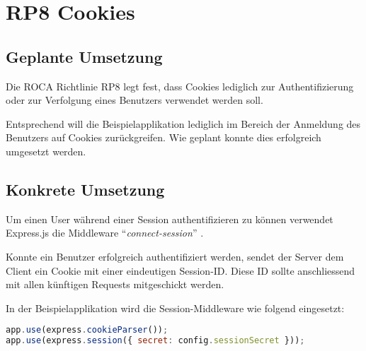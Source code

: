 \section{RP8 Cookies}
\label{sec:principle-rp8-cookies}

\subsection*{Geplante Umsetzung}
Die ROCA Richtlinie RP8 legt fest, dass Cookies lediglich zur Authentifizierung oder zur Verfolgung eines Benutzers verwendet werden soll.

Entsprechend will die Beispielapplikation lediglich im Bereich der Anmeldung des Benutzers auf Cookies zurückgreifen. Wie geplant konnte dies erfolgreich umgesetzt werden.

\subsection*{Konkrete Umsetzung}
Um einen User während einer Session authentifizieren zu können verwendet Express.js \cite{Expressjs} die \gls{Middleware} ``\emph{connect-session}'' \cite{ConnectSession}.

Konnte ein Benutzer erfolgreich authentifiziert werden, sendet der Server dem Client ein Cookie mit einer eindeutigen Session-ID. Diese ID sollte anschliessend mit allen künftigen Requests mitgeschickt werden.

In der Beispielapplikation wird die Session-Middleware wie folgend eingesetzt:

\begin{lstlisting}[language=JavaScript, caption=Connect Session Middleware \cite{RoomiesMiddlewareHttp}, label=lst:connect-session-middleware]
app.use(express.cookieParser());
app.use(express.session({ secret: config.sessionSecret }));
\end{lstlisting}